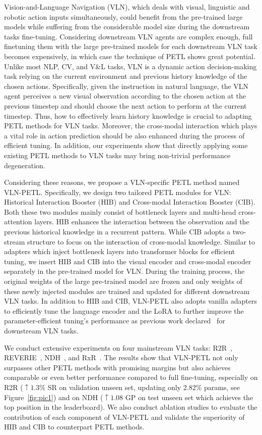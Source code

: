 \documentclass[10pt,twocolumn,letterpaper]{article}
\begin{document}
Vision-and-Language Navigation (VLN), which deals with visual, linguistic and robotic action inputs simultaneously, could benefit from the pre-trained large models while suffering from the considerable model size during the downstream tasks fine-tuning. Considering downstream VLN agents are complex enough, full finetuning them with the large pre-trained models for each downstream VLN task becomes expensively, in which case the technique of PETL shows great potential.
Unlike most NLP, CV, and V\&L tasks, VLN is a dynamic action decision-making task relying on the current environment and previous history knowledge of the chosen actions. Specifically, given the instruction in natural language, the VLN agent perceives a new visual observation according to the chosen action at the previous timestep and should choose the next action to perform at the current timestep. Thus, how to effectively learn history knowledge is crucial to adapting PETL methods for VLN tasks. Moreover, the cross-modal interaction which plays a vital role in action prediction should be also enhanced during the process of efficient tuning. In addition, our experiments show that directly applying some existing PETL methods to VLN tasks may bring non-trivial performance degeneration.

Considering these reasons, we propose a VLN-specific PETL method named VLN-PETL. 
Specifically, we design two tailored PETL modules for VLN: Historical Interaction Booster (HIB) and Cross-modal Interaction Booster (CIB). Both these two modules mainly consist of bottleneck layers and multi-head cross-attention layers.
HIB enhances the interaction between the observation and the previous historical knowledge in a recurrent pattern.
While CIB adopts a two-stream structure to focus on the interaction of cross-modal knowledge. 
Similar to adapters which inject bottleneck layers into transformer blocks for efficient tuning, we insert HIB and CIB into the visual encoder and cross-modal encoder separately in the pre-trained model for VLN. During the training process, the original weights of the large pre-trained model are frozen and only weights of these newly injected modules are trained and updated for different downstream VLN tasks.
In addition to HIB and CIB, VLN-PETL also adopts vanilla adapters to efficiently tune the language encoder and the LoRA to further improve the parameter-efficient tuning's performance as previous work declared~\cite{unified-petl,unipelt,zhang2022hyperpelt} for downstream VLN tasks.

We conduct extensive experiments on four mainstream VLN tasks: R2R~\cite{r2r}, REVERIE~\cite{reverie}, NDH~\cite{ndh}, and RxR~\cite{rxr}. The results show that VLN-PETL not only surpasses other PETL methods with promising margins but also achieves comparable or even better performance compared to full fine-tuning, especially on R2R ($\uparrow1.3\% $ SR on validation unseen set, updating only 2.82\% params, see Figure~\ref{fig:pic1}) and on NDH ($\uparrow1.08$ GP on test unseen set which achieves the top position in the leaderboard). We also conduct ablation studies to evaluate the contribution of each component of VLN-PETL and validate the superiority of HIB and CIB to counterpart PETL methods.
\end{document}
